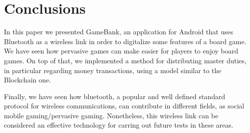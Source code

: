 \section*{Conclusions}

In this paper we presented GameBank, an application for Android that uses 
Bluetooth as a wireless link in order to digitalize some features of a board 
game. We have seen how pervasive games can make easier for players to enjoy 
board games. On top of that, we implemented a method for distributing master 
duties, in particular regarding money transactions, using a model similar to 
the Blockchain one.

Finally, we have seen how bluetooth, a popular and well defined standard 
protocol for wireless communications, can contribute in different fields, as 
social mobile gaming/pervasive gaming. Nonetheless, this wireless link can be 
considered an effective technology for carring out future tests in these areas.